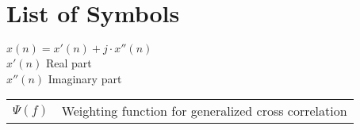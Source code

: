 \chapter*{List of Symbols}
\label{sec:symbolverzeichnis}


$x(n)=x'(n)+ j\cdot x''(n)$\\
$x'(n)$				Real part\\
$x''(n)$			Imaginary part\\

\begin{table}[htbp]
\begin{tabular}[t]{ll}
$\Psi(f)$       &   Weighting function for generalized cross correlation\\

\end{tabular}
\end{table}
